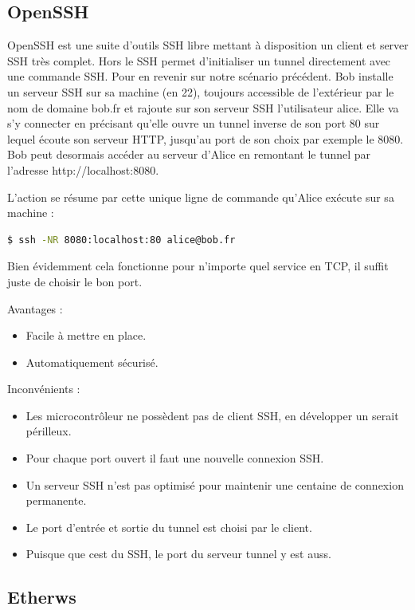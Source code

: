 \subsection{OpenSSH}

OpenSSH est une suite d'outils SSH libre mettant à disposition un client et server SSH très complet. Hors le SSH permet d'initialiser un tunnel directement avec une commande SSH. Pour en revenir sur notre scénario précédent. Bob installe un serveur SSH sur sa machine (en 22), toujours accessible de l'extérieur par le nom de domaine bob.fr et rajoute sur son serveur SSH l'utilisateur alice. Elle va s'y connecter en précisant qu'elle ouvre un tunnel inverse de son port 80 sur lequel écoute son serveur HTTP, jusqu'au port de son choix par exemple le 8080. Bob peut desormais accéder au serveur d'Alice en remontant le tunnel par l'adresse http://localhost:8080.

 L'action se résume par cette unique ligne de commande qu'Alice exécute sur sa machine :
\begin{lstlisting}[language=bash]
  $ ssh -NR 8080:localhost:80 alice@bob.fr
\end{lstlisting}%

Bien évidemment cela fonctionne pour n'importe quel service en TCP, il suffit juste de choisir le bon port.

Avantages :
\begin{itemize}
    \item Facile à mettre en place.
    \item Automatiquement sécurisé.
\end{itemize}

Inconvénients :
\begin{itemize}
    \item Les microcontrôleur ne possèdent pas de client SSH, en développer un serait périlleux.
    \item Pour chaque port ouvert il faut une nouvelle connexion SSH.
    \item Un serveur SSH n'est pas optimisé pour maintenir une centaine de connexion permanente.
    \item Le port d'entrée et sortie du tunnel est choisi par le client.
    \item Puisque que cest du SSH, le port du serveur tunnel y est auss.
\end{itemize}

\subsection{Etherws}

